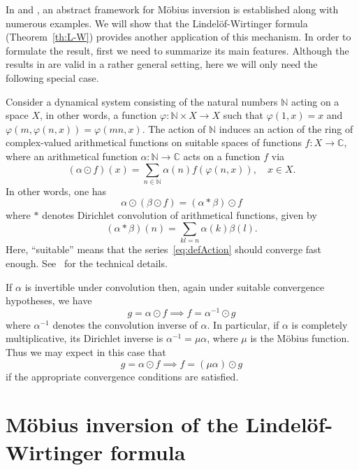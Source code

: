 \documentclass[11pt,a4paper,reqno]{amsart}
\newcommand{\C}{\mathbb{C}}
\newcommand{\N}{\mathbb{N}}
\theoremstyle{plain}
\theoremstyle{remark}
\numberwithin{equation}{section}
\begin{document}
In \cite{BNV} and \cite{BNV2}, an abstract framework for M\"obius inversion is established along with numerous examples. We will show that the Lindel\"of-Wirtinger formula (Theorem~\ref{th:L-W}) provides another application of this mechanism. In order to formulate the result, first we need to summarize its main features.
Although the results in \cite{BNV} are valid in a rather general setting, here we will only need the following special case.

Consider a dynamical system consisting of the natural numbers $\N$ acting on
a space $X$, in other words, a function $\varphi : \N \times X \to X$ such that $\varphi(1,x) = x$ and $\varphi(m,\varphi(n,x)) = \varphi(mn,x)$.
The action of $\N$ induces an action of the ring of complex-valued arithmetical functions on suitable spaces of functions $f : X \to \C$, where an arithmetical function $\alpha : \N \to \C$ acts on a function $f$ via
%
\begin{equation}
\label{eq:defAction}
	(\alpha \odot f)(x) = \sum_{n \in \N} \alpha(n) f(\varphi(n,x)),
	\quad
	x \in X.
\end{equation}
%
In other words, one has
%
\begin{equation*}
	\alpha \odot (\beta \odot f) = (\alpha \ast \beta) \odot f
\end{equation*}
%
where $\ast$ denotes Dirichlet convolution of arithmetical functions, given by
\[
	(\alpha * \beta)(n) = \sum_{kl = n}	\alpha(k)\beta(l).
\]
Here, ``suitable'' means that the series~\eqref{eq:defAction} should converge fast enough. See~\cite{BNV} for the technical details. 

If $\alpha$ is invertible under convolution then, again under suitable convergence hypotheses, we have
%
\begin{equation*}
	g = \alpha \odot f \implies f = \alpha^{-1} \odot g
\end{equation*}
%
where $\alpha^{-1}$ denotes the convolution inverse of $\alpha$. In particular, if $\alpha$ is completely multiplicative, its Dirichlet inverse is $\alpha^{-1} = \mu \alpha$, where $\mu$ is the M\"obius function. Thus we may expect in this case that
%
\begin{equation}
\label{eq:invCM}
	g = \alpha \odot f \implies f = (\mu \alpha) \odot g
\end{equation}
%
if the appropriate convergence conditions are satisfied.


\section{M\"obius inversion of the Lindel\"of-Wirtinger formula}
\label{sec:LW-inv}
\end{document}

